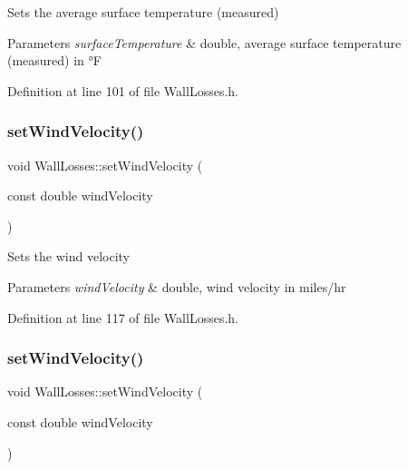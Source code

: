 Sets the average surface temperature (measured) 
\begin{DoxyParams}{Parameters}
{\em surface\+Temperature} & double, average surface temperature (measured) in °F \\
\hline
\end{DoxyParams}


Definition at line 101 of file Wall\+Losses.\+h.

\mbox{\label{class_wall_losses_ae376b7ce4e5b3c45a663395802c176a9}} 
\subsubsection{\texorpdfstring{set\+Wind\+Velocity()}{setWindVelocity()}\hspace{0.1cm}{\footnotesize\ttfamily [1/3]}}
{\footnotesize\ttfamily void Wall\+Losses\+::set\+Wind\+Velocity (\begin{DoxyParamCaption}\item[{const double}]{wind\+Velocity }\end{DoxyParamCaption})\hspace{0.3cm}{\ttfamily [inline]}}

Sets the wind velocity 
\begin{DoxyParams}{Parameters}
{\em wind\+Velocity} & double, wind velocity in miles/hr \\
\hline
\end{DoxyParams}


Definition at line 117 of file Wall\+Losses.\+h.

\mbox{\label{class_wall_losses_ae376b7ce4e5b3c45a663395802c176a9}} 
\subsubsection{\texorpdfstring{set\+Wind\+Velocity()}{setWindVelocity()}\hspace{0.1cm}{\footnotesize\ttfamily [2/3]}}
{\footnotesize\ttfamily void Wall\+Losses\+::set\+Wind\+Velocity (\begin{DoxyParamCaption}\item[{const double}]{wind\+Velocity }\end{DoxyParamCaption})\hspace{0.3cm}{\ttfamily [inline]}}

